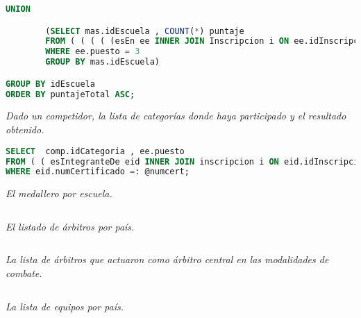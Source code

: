 \begin{lstlisting}[language=SQL]
	UNION

		(SELECT	mas.idEscuela , COUNT(*) puntaje 
		FROM ( ( ( ( (esEn ee INNER JOIN Inscripcion i ON ee.idInscripcion = i.idInscripcion) INNER JOIN  esIntegranteDe eid ON eid.idInscripcion = i.idInscripcion ) INNER JOIN Estudiante e ON e.numCertificado = eid.numCertificado) INNER JOIN Escuela esc ON e.idEscuela = esc.idEscuela) INNER JOIN Mestro mas ON esc.idMaestro = mas.placaInstructor) 
		WHERE ee.puesto = 3
		GROUP BY mas.idEscuela)

GROUP BY idEscuela
ORDER BY puntajeTotal ASC;
\end{lstlisting}


\emph{Dado un competidor, la lista de categorías donde haya participado y el resultado obtenido.}
\begin{lstlisting}[language=SQL]
SELECT	comp.idCategoria , ee.puesto
FROM ( ( esIntegranteDe eid INNER JOIN inscripcion i ON eid.idInscripcion = i.idInscripcion ) INNER JOIN esEn ee ON ee.idInscripcion = i.idInscripcion) INNER JOIN Competencia comp ON ee.idCompetencia = comp.idCompetencia 
WHERE eid.numCertificado =: @numcert;
\end{lstlisting}



\emph{El medallero por escuela.}
\begin{lstlisting}[language=SQL]
%% ACA LA QUERY
\end{lstlisting}


\emph{El listado de árbitros por país.}
\begin{lstlisting}[language=SQL]
%% ACA LA QUERY
\end{lstlisting}


\emph{La lista de árbitros que actuaron como árbitro central en las modalidades de combate.}
\begin{lstlisting}[language=SQL]
%% ACA LA QUERY
\end{lstlisting}


\emph{La lista de equipos por país.}
\begin{lstlisting}[language=SQL]
%% ACA LA QUERY
\end{lstlisting}
